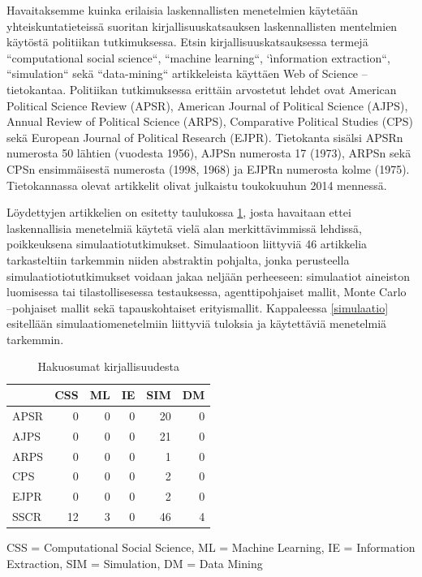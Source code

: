 \documentclass[finnish,gradu,twoside,12pt]{tktltiki}
\begin{document}
Havaitaksemme kuinka erilaisia laskennallisten menetelmien käytetään yhteiskuntatieteissä suoritan kirjallisuuskatsauksen laskennallisten mentelmien käytöstä politiikan tutkimuksessa. Etsin kirjallisuuskatsauksessa termejä ``computational social science``, ``machine learning``, `ìnformation extraction``, ``simulation`` sekä ``data-mining`` artikkeleista käyttäen Web of Science --tietokantaa. Politiikan tutkimuksessa erittäin arvostetut lehdet ovat American Political Science Review (APSR), American Journal of Political Science  (AJPS), Annual Review of Political Science (ARPS), Comparative Political Studies (CPS) sekä European Journal of Political Research (EJPR). Tietokanta sisälsi APSRn numerosta 50 lähtien (vuodesta 1956), AJPSn numerosta 17 (1973), ARPSn sekä CPSn ensimmäisestä numerosta (1998, 1968) ja EJPRn numerosta kolme (1975). Tietokannassa olevat artikkelit olivat julkaistu toukokuuhun 2014 mennessä. %

Löydettyjen artikkelien on esitetty taulukossa \ref{kirjallisuuskataus}, josta havaitaan ettei laskennallisia menetelmiä käytetä vielä alan merkittävimmissä lehdissä, poikkeuksena simulaatiotutkimukset. Simulaatioon liittyviä 46 artikkelia tarkasteltiin tarkemmin niiden abstraktin pohjalta, jonka perusteella simulaatiotiotutkimukset voidaan jakaa neljään perheeseen: simulaatiot aineiston luomisessa tai tilastollisesessa testauksessa, agenttipohjaiset mallit, Monte Carlo --pohjaiset mallit sekä tapauskohtaiset erityismallit. Kappaleessa \ref{simulaatio} esitellään simulaatiomenetelmiin liittyviä tuloksia ja käytettäviä menetelmiä tarkemmin.

\begin{table}

\begin{tabular}{lrrrrr}
~  & CSS & ML & IE  & SIM & DM \\
\hline
APSR  & 0 & 0 & 0 & 20 & 0 \\
AJPS  & 0 & 0 & 0 & 21 & 0 \\
ARPS  & 0 & 0 & 0 &  1 & 0 \\ 
CPS   & 0 & 0 & 0 &  2 & 0 \\
EJPR  & 0 & 0 & 0 &  2 & 0 \\
\hline
SSCR & 12 & 3 & 0 & 46 & 4  \\
\hline
\end{tabular}
\caption{Hakuosumat kirjallisuudesta}
CSS = Computational Social Science, ML = Machine Learning, IE = Information Extraction, SIM = Simulation, DM = Data Mining
\label{kirjallisuuskataus}

\end{table}
\end{document}
